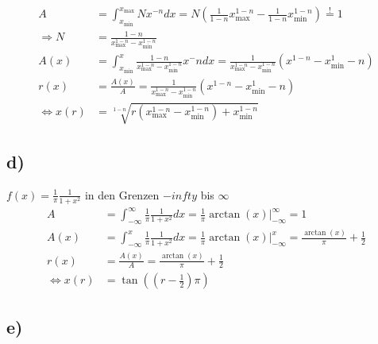 \begin{align}
A&=\int_{x_\text{min}}^{x_\text{max}} Nx^{-n} dx=
N(\frac{1}{1-n}x_\text{max}^{1-n}-\frac{1}{1-n}x_\text{min}^{1-n})\stackrel{!}{=}1\\
\Rightarrow N&=\frac{1-n}{x_\text{max}^{1-n}-x_\text{min}^{1-n}}\\
A(x)&=\int_{x_\text{min}}^x \frac{1-n}{x_\text{max}^{1-n}-x_\text{min}^{1-n}}x^-n dx=\frac{1}{x_\text{max}^{1-n}-x_\text{min}^{1-n}}\left(x^{1-n}-x_\text{min}^1-n\right)\\
r(x)&=\frac{A(x)}{A}=\frac{1}{x_\text{max}^{1-n}-x_\text{min}^{1-n}}\left(x^{1-n}-x_\text{min}^1-n\right)\\
\iff x(r) &=\sqrt[1-n]{r(x_\text{max}^{1-n}-x_\text{min}^{1-n})+x_\text{min}^{1-n}}
\end{align}

\subsection{d)}
\label{subsec:a3d}
$f(x)=\frac{1}{\pi}\frac{1}{1+x^{2}} $ in den Grenzen $-infty$ bis $\infty$
\begin{align}
A&=\int_{-\infty}^{\infty} \frac{1}{\pi}\frac{1}{1+x^{2}}dx =\frac{1}{\pi} \arctan(x)\bigr|_{-\infty}^{\infty}=1 \\
A(x)&=\int_{-\infty}^{x} \frac{1}{\pi}\frac{1}{1+x^{2}}dx =\frac{1}{\pi} \arctan(x)\bigr|_{-\infty}^{x}
=\frac{\arctan(x)}{\pi}+\frac{1}{2}\\
r(x)&=\frac{A(x)}{A}=\frac{\arctan(x)}{\pi}+\frac{1}{2}\\
\iff x(r)&=\tan\left(\left(r-\frac{1}{2}\right)\pi\right)
\end{align}


\subsection{e)}
\label{subsec:a3e}

